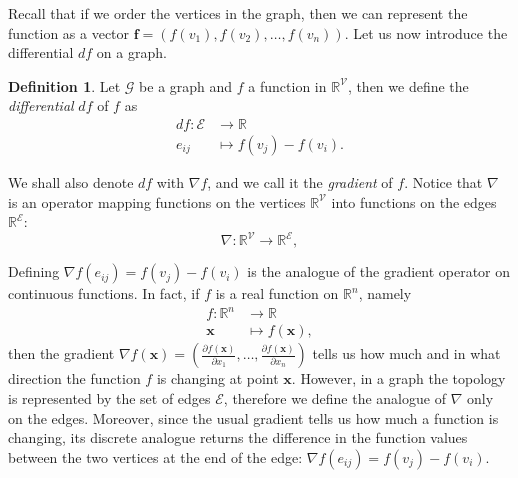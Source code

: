 \documentclass[12pt,a4paper]{report}
\theoremstyle{definition}
\newtheorem{definition}{Definition}[chapter]
\begin{document}
Recall that if we order the vertices in the graph, then we can represent the function as a vector $\textbf{f} = \left( f(v_1), f(v_2), \ldots, f(v_n)\right)$.
Let us now introduce the differential $df$ on a graph.
\begin{definition}
Let $\mathcal{G}$ be a graph and $f$ a function in $\mathbb{R}^{\mathcal{V}}$, then we define the \emph{differential} $df$ of $f$ as
\begin{align*}
    df \colon \mathcal{E} & \longrightarrow \mathbb{R} \\
    e_{ij} & \longmapsto f(v_j) - f(v_i) .
\end{align*}
\end{definition}
We shall also denote $df$ with $\nabla f$, and we call it the \emph{gradient} of $f$.
Notice that $\nabla$ is an operator mapping functions on the vertices $\mathbb{R}^{\mathcal{V}}$ into functions on the edges $\mathbb{R}^{\mathcal{E}}$:
\begin{equation*}
    \nabla \colon \mathbb{R}^{\mathcal{V}} \longrightarrow \mathbb{R}^{\mathcal{E}} ,
\end{equation*}

Defining $\nabla f (e_{ij}) = f(v_j) - f(v_i)$ is the analogue of the gradient operator on continuous functions. In fact, if $f$ is a real function on $\mathbb{R}^n$, namely
\begin{align*}
    f \colon \mathbb{R}^n & \longrightarrow \mathbb{R} \\
    \mathbf{x} & \longmapsto f(\mathbf{x}) ,
\end{align*}
then the gradient $\nabla f(\mathbf{x}) = \left( \frac{\partial f(\mathbf{x})}{\partial x_1}, \ldots, \frac{\partial f(\mathbf{x})}{\partial x_n} \right)$ tells us how much and in what direction the function $f$ is changing at point $\mathbf{x}$.
However, in a graph the topology is represented by the set of edges $\mathcal{E}$, therefore we define the analogue of $\nabla$ only on the edges.
Moreover, since the usual gradient tells us how much a function is changing, its discrete analogue returns the difference in the function values between the two vertices at the end of the edge: $\nabla f (e_{ij}) = f(v_j)-f(v_i)$.
\end{document}
